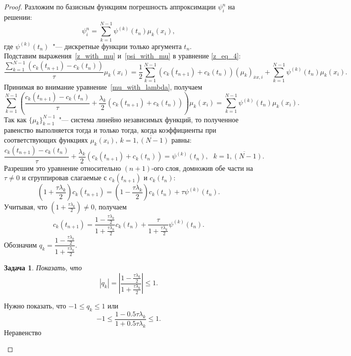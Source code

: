 \documentclass[11pt,a4paper,twoside]{report}
\numberwithin{equation}{section}
\newtheorem*{problem}{Задача}
\theoremstyle{definition}
\theoremstyle{plain}
\begin{document}
\begin{proof}
Разложим по базисным функциям погрешность аппроксимации $\psi_i^n$ на решении:
%
\begin{equation}
%
    \label{psi_with_mu}
    \psi_i^n = \sum_{k=1}^{N-1} \psi^{(k)}(t_n) \mu_k(x_i),
%
\end{equation}
%
где $\psi^{(k)}(t_n)$~"--- дискретные функции только аргумента $t_n$.\\
Подставим выражения~\eqref{z_with_mu} и~\eqref{psi_with_mu} в уравнение
\eqref{z_eq_4}:
%
$$
    \frac{\sum_{k=1}^{N-1}(c_k(t_{n+1}) - c_k(t_n))}{\tau} \mu_k(x_i) =
    \frac12 \sum_{k=1}^{N-1} \left(c_k(t_{n+1}) + c_k(t_n)\right)(\mu_k)_{\overline{x}x, i} +
    \sum_{k=1}^{N-1} \psi^{(k)}(t_n)\mu_k(x_i).
$$
%
Принимая во внимание уравнение~\eqref{mu_with_lambda}, получаем
%
$$
    \sum_{k=1}^{N-1} \left(\frac{c_k(t_{n+1}) - c_k(t_n)}{\tau} +
    \frac{\lambda_k}{2} (c_k(t_{n+1}) + c_k(t_n))\right)\mu_k(x_i) =
    \sum_{k=1}^{N-1} \psi^{(k)}(t_n)\mu_k(x_i).
$$
%
Так как $\{\mu_k\}_{k=1}^{N-1}$~"--- система линейно независимых функций, то
полученное равенство выполняется тогда и только тогда, когда коэффициенты при
соответствующих функциях $\mu_k(x_i), ~k = \overline{1, (N-1)}$ равны:
%
$$
    \frac{c_k(t_{n+1}) - c_k(t_n)}{\tau} + \frac{\lambda_k}{2} (c_k(t_{n+1}) + c_k(t_n)) =
    \psi^{(k)}(t_n), ~~~k = \overline{1, (N-1)}.
$$
%
Разрешим это уравнение относительно $(n+1)$-ого слоя, домножив обе части на $\tau\neq0$
и сгруппировав слагаемые с $c_k(t_{n+1})$ и $c_k(t_n)$:
%
$$
    \left(1+\frac{\tau\lambda_k}{2}\right) c_k(t_{n+1}) =
    \left(1-\frac{\tau\lambda_k}{2}\right) c_k(t_n) + \tau\psi^{(k)}(t_n).
$$
%
Учитывая, что $\left(1 + \frac{\tau\lambda_k}{2}\right)\neq0$, получаем
%
\begin{equation}
%
    \label{ck_with_almost_q}
    c_k(t_{n+1}) = \frac{1-\frac{\tau\lambda_k}{2}}{1+\frac{\tau\lambda_k}{2}}
    c_k(t_n)+\frac{\tau}{1+\frac{\tau\lambda_k}{2}} \psi^{(k)}(t_n).
%
\end{equation}
%
Обозначим $q_k = \dfrac{1-\frac{\tau\lambda_k}{2}}{1+\frac{\tau\lambda_k}{2}}$.
%
\begin{problem}
%
    Показать, что
    $$
        |q_k| = \left|\dfrac{1 - \frac{\tau\lambda_k}{2}}
        {1 + \frac{\tau\lambda_k}{2}}\right| \leqslant 1.
    $$
%
\end{problem}
%
\begin{solution}
    Нужно показать, что $-1 \leqslant q_k \leqslant 1$ или
    $$
        -1 \leqslant \dfrac{1-0.5\tau\lambda_k}{1+0.5\tau\lambda_k} \leqslant 1.
    $$
    Неравенство

\end{solution}
\end{proof}
\end{document}
